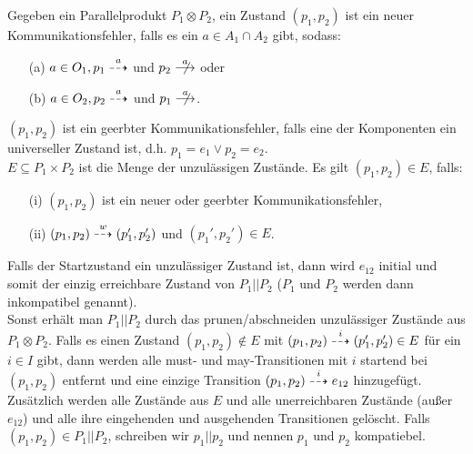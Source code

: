 \begin{Def}[Parallelkomposition]
  Gegeben ein Parallelprodukt $P_1\otimes P_2$, ein Zustand $(p_1,p_2)$ ist ein
  neuer Kommunikationsfehler, falls es ein $a\in A_1\cap A_2$ gibt, sodass:
  \begin{itemize}
    \item[(a)] $a\in O_1, p_1\may[a]$ und $p_2\nmust[a]$ oder
    \item[(b)] $a\in O_2, p_2\may[a]$ und $p_1\nmust[a]$.
  \end{itemize}
  $(p_1,p_2)$ ist ein geerbter Kommunikationsfehler, falls eine der Komponenten
  ein universeller Zustand ist, d.h. $p_1=e_1\lor p_2=e_2$.\\
  $E\subseteq P_1\times P_2$ ist die Menge der unzulässigen Zustände. Es gilt
  $(p_1,p_2)\in E$, falls:
  \begin{itemize}
    \item[(i)] $(p_1,p_2)$ ist ein neuer oder geerbter Kommunikationsfehler,
    \item[(ii)] $(p_1,p_2)\may[w] (p_1',p_2')$ und $(p_1',p_2')\in E$.
  \end{itemize}
  Falls der Startzustand ein unzulässiger Zustand ist, dann wird $e_{12}$
  initial und somit der einzig erreichbare Zustand von $P_1||P_2$ ($P_1$ und
  $P_2$ werden dann inkompatibel genannt).\\
  Sonst erhält man $P_1||P_2$ durch das prunen/abschneiden  unzulässiger Zustände aus $P_1\otimes P_2$. Falls es einen Zustand
  $(p_1,p_2)\notin E$ mit $(p_1,p_2)\may[i](p_1',p_2')\in E$ für ein $i\in I$
  gibt, dann werden alle must- und may-Transitionen mit $i$ startend bei
  $(p_1,p_2)$ entfernt und eine einzige Transition $(p_1,p_2)\may[i]e_{12}$
  hinzugefügt. Zusätzlich werden alle Zustände aus $E$ und alle unerreichbaren
  Zustände (außer $e_{12}$) und alle ihre eingehenden und ausgehenden
  Transitionen gelöscht. Falls $(p_1,p_2)\in P_1||P_2$, schreiben wir
  $p_1||p_2$ und nennen $p_1$ und $p_2$ kompatiebel.
\end{Def}
